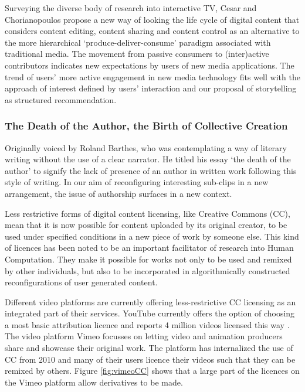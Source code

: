 Surveying the diverse body of research into interactive TV, Cesar and Chorianopoulos propose a new way of looking the life cycle of digital content that considers content editing, content sharing and content control as an alternative to the more hierarchical `produce-deliver-consume' paradigm associated with traditional media\cite{Cesar:2009fk}. The movement from passive consumers to (inter)active contributors indicates new expectations by users of new media applications. The trend of users' more active engagement in new media technology fits well with the approach of interest defined by users' interaction and our proposal of storytelling as structured recommendation.

\subsubsection{The Death of the Author, the Birth of Collective Creation}
Originally voiced by Roland Barthes, who was contemplating a way of literary writing without the use of a clear narrator. He titled his essay `the death of the author' to signify the lack of presence of an author in written work following this style of writing. In our aim of reconfiguring interesting sub-clips in a new arrangement, the issue of authorship surfaces in a new context.

Less restrictive forms of digital content licensing, like Creative Commons (CC), mean that it is now possible for content uploaded by its original creator, to be used under specified conditions in a new piece of work by someone else. This kind of licences has been noted to be an important facilitator of research into Human Computation\cite{Law:2009vl}. They make it possible for works not only to be used and remixed by other individuals, but also to be incorporated in algorithmically constructed reconfigurations of user generated content.

Different video platforms are currently offering less-restrictive CC licensing as an integrated part of their services. YouTube currently offers the option of choosing a most basic attribution licence and reports 4 million videos licensed this way \cite{YouTubeCC}. The video platform Vimeo focusses on letting video and animation producers share and showcase their original work. The platform has internalized the use of CC from 2010\cite{vimeoTimeline} and many of their users licence their videos such that they can be remixed by others. Figure \ref{fig:vimeoCC} shows that a large part of the licences on the Vimeo platform allow derivatives to be made\cite{vimeoCC}.

